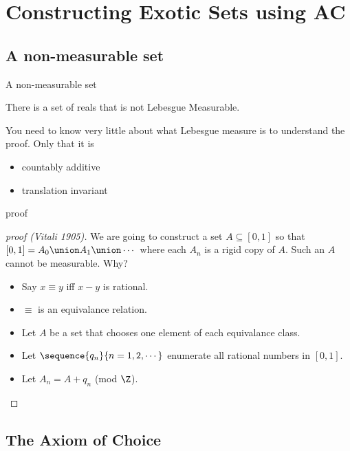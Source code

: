 \documentclass{beamer}
\begin{document}
\section{Constructing Exotic Sets using AC}

\subsection{A non-measurable set}

\begin{frame}{A non-measurable set}
\begin{theorem}
There is a set of reals that is not Lebesgue Measurable.
\end{theorem}

\vfill

\pause
You need to know very little  about what Lebesgue measure is to
understand the proof. Only that it is
\begin{itemize}
  \item countably additive
  \item translation invariant
\end{itemize}

\end{frame}


\begin{frame}{proof}

\begin{proof}[proof (Vitali 1905)]
We are going to construct a set
$A \subseteq [0, 1]$ so that $[0,1] = A_0 \union A_1 \union \cdots$ where each
$A_n$ is a rigid copy of $A$. Such an $A$ cannot be measurable. Why?

\begin{itemize}
  \item Say $x\equiv y$ iff $x-y$ is rational.
  \item $\equiv$ is an equivalance relation.
  \item Let $A$ be a set that chooses one element of each equivalance class.
  \item Let $\sequence{q_n}{n = 1,2,\cdots}$ enumerate all rational numbers in
$[0,1]$.
   \item Let $A_n = A + q_n$ (mod $\Z$).
\end{itemize}
\end{proof}
\end{frame}

\subsection{The Axiom of Choice}
\end{document}
